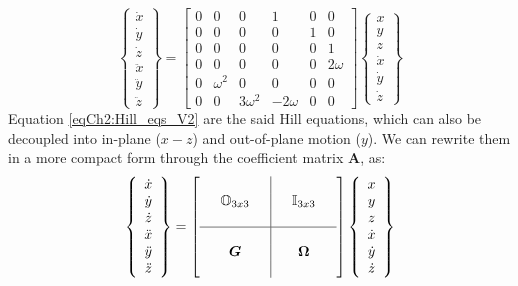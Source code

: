 	\begin{equation}
	\left\{
	\begin{array}{c}
	\dot{x}\\
	\dot{y}\\
	\dot{z}\\
	\ddot{x}\\
	\ddot{y}\\
	\ddot{z}
	\end{array}\right\}
	= 
	\left[
	\begin{array}{ccc|ccc}
	0 		& 0			& 0			& 1			& 0		& 0\\
	0 		& 0			& 0			& 0			& 1		& 0\\
	0 		& 0			& 0			& 0			& 0		& 1\\
	\hline
	0 		& 0			& 0			& 0			& 0		& 2\omega\\
	0 		& \omega^2	& 0			& 0			& 0		& 0\\
	0 		& 0			& 3\omega^2 & -2\omega	& 0		& 0
	\end{array}\right] 
	\left\{
	\begin{array}{c}
	x\\
	y\\
	z\\
	\dot{x}\\
	\dot{y}\\
	\dot{z}
	\end{array}\right\}
	\label{eqCh2:Hill_eqs_V2}
	\end{equation}
	\indent Equation \eqref{eqCh2:Hill_eqs_V2} are the said Hill equations, which can also be decoupled into in-plane ($x-z$) and out-of-plane motion ($y$). We can rewrite them in a more compact form through the coefficient matrix $\bm A$, as:
	\begin{equation}
	\left\{
	\begin{array}{c}
	\dot{x}\\
	\dot{y}\\
	\dot{z}\\
	\ddot{x}\\
	\ddot{y}\\
	\ddot{z}
	\end{array}\right\}
	= 
	\left[
	\begin{array}{ccc|ccc}
	  		&  					&  			&  			&  					&  \\
	 		& \mathbb{O}_{3x3}	&  			&  			& \mathbb{I}_{3x3}	&  \\
	 		& 					&  			&  			&  					&  \\
	\hline
	 	  	&  					&  			&  			&  					&  \\
	 		& \mbox{\boldmath{${G}$}}				&  			&  			& \mbox{\boldmath{${\Omega}$}}		&  \\
	 		& 					&  			&  			&  					&  \\
	\end{array}\right] 
	\left\{
	\begin{array}{c}
	x\\
	y\\
	z\\
	\dot{x}\\
	\dot{y}\\
	\dot{z}
	\end{array}\right\}
	\label{eqCh2:Hill_eqs_V3}
	\end{equation}
